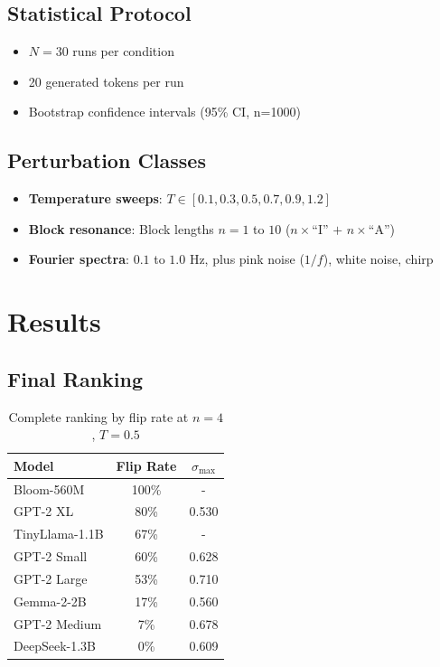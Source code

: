 \documentclass{article}
\begin{document}
\subsection{Statistical Protocol}

\begin{itemize}
    \item $N = 30$ runs per condition
    \item 20 generated tokens per run
    \item Bootstrap confidence intervals (95\% CI, n=1000)
\end{itemize}

\subsection{Perturbation Classes}

\begin{itemize}
    \item \textbf{Temperature sweeps}: $T \in [0.1, 0.3, 0.5, 0.7, 0.9, 1.2]$
    \item \textbf{Block resonance}: Block lengths $n = 1$ to $10$ ($n\times$``I'' $+$ $n\times$``A'')
    \item \textbf{Fourier spectra}: $0.1$ to $1.0$ Hz, plus pink noise ($1/f$), white noise, chirp
\end{itemize}

\section{Results}

\subsection{Final Ranking}

\begin{table}[H]
\centering
\caption{Complete ranking by flip rate at $n=4$, $T=0.5$}
\label{tab:ranking}
\begin{tabular}{lcc}
\toprule
Model & Flip Rate & $\sigma_{\max}$ \\
\midrule
Bloom-560M & 100\% & - \\
GPT-2 XL & 80\% & 0.530 \\
TinyLlama-1.1B & 67\% & - \\
GPT-2 Small & 60\% & 0.628 \\
GPT-2 Large & 53\% & 0.710 \\
Gemma-2-2B & 17\% & 0.560 \\
GPT-2 Medium & 7\% & 0.678 \\
DeepSeek-1.3B & 0\% & 0.609 \\
\bottomrule
\end{tabular}
\end{table}
\end{document}
